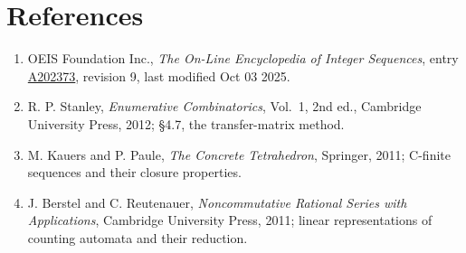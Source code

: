 \documentclass[11pt]{article}
\theoremstyle{definition}
\begin{document}
\section{References}

\begin{enumerate}

\item OEIS Foundation Inc., \emph{The On-Line Encyclopedia of Integer Sequences}, entry \href{https://oeis.org/A202373}{A202373}, revision 9, last modified Oct 03 2025.

\item R. P. Stanley, \emph{Enumerative Combinatorics}, Vol.~1, 2nd ed., Cambridge University Press, 2012; \S4.7, the transfer-matrix method.

\item M. Kauers and P. Paule, \emph{The Concrete Tetrahedron}, Springer, 2011; C-finite sequences and their closure properties.

\item J. Berstel and C. Reutenauer, \emph{Noncommutative Rational Series with Applications}, Cambridge University Press, 2011; linear representations of counting automata and their reduction.

\end{enumerate}
\end{document}
